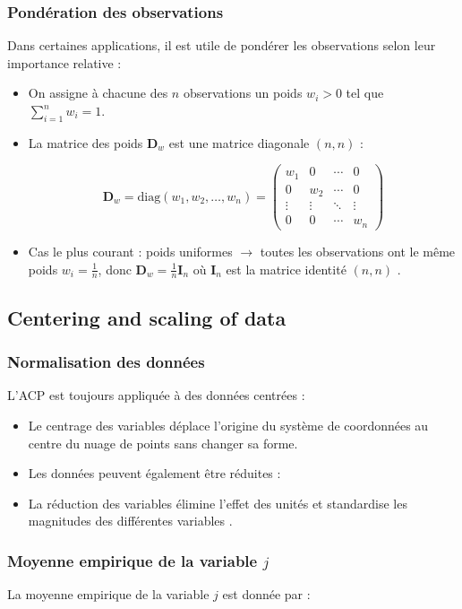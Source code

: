 \documentclass[10pt,a4paper]{article}
\begin{document}
\subsubsection*{Pondération des observations}
Dans certaines applications, il est utile de pondérer les observations selon leur importance relative :
\begin{itemize}
    \item On assigne à chacune des $n$ observations un poids $w_i > 0$ tel que $\sum_{i=1}^n w_i = 1$.
    \item La matrice des poids $\mathbf{D}_w$ est une matrice diagonale $(n, n)$ :

\[
\mathbf{D}_w = \text{diag}(w_1, w_2, \ldots, w_n) = \begin{pmatrix}
w_1 & 0 & \cdots & 0 \\
0 & w_2 & \cdots & 0 \\
\vdots & \vdots & \ddots & \vdots \\
0 & 0 & \cdots & w_n
\end{pmatrix}
\]

    \item Cas le plus courant : poids uniformes $\rightarrow$ toutes les observations ont le même poids $w_i = \frac{1}{n}$, donc $\mathbf{D}_w = \frac{1}{n} \mathbf{I}_n$ où $\mathbf{I}_n$ est la matrice identité $(n, n)$ \cite{pmc_pca}.
\end{itemize}

\subsection*{Centering and scaling of data}
\subsubsection*{Normalisation des données}
L'ACP est toujours appliquée à des données centrées :
\begin{itemize}
    \item Le centrage des variables déplace l'origine du système de coordonnées au centre du nuage de points sans changer sa forme.
    \item Les données peuvent également être réduites :
    \item La réduction des variables élimine l'effet des unités et standardise les magnitudes des différentes variables \cite{builtin_pca}.
\end{itemize}

\subsubsection*{Moyenne empirique de la variable $j$}
La moyenne empirique de la variable $j$ est donnée par :
\end{document}
